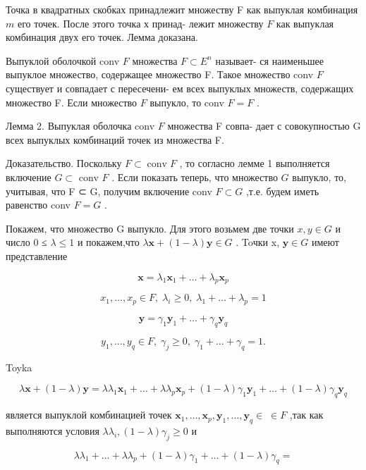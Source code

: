 \documentclass[8pt]{extarticle}
\begin{document}
Точка в квадратных скобках принадлежит множеству F как выпуклая комбинация \(m\) его точек. После этого точка х принад- лежит множеству \(F\) как выпуклая комбинация двух его точек. Лемма доказана.

Выпуклой оболочкой conv \(F\) множества \(F \subset  E^n\) называет- ся наименьшее выпуклое множество, содержащее множество F. Такое множество conv \(F\) существует и совпадает с пересечени- ем всех выпуклых множеств, содержащих множество F. Если множество \(F\) выпукло, то conv \(F = F\) .

Лемма 2. Выпуклая оболочка conv \(F\) множества F совпа- дает с совокупностью G всех выпуклых комбинаций точек из множества F.

Доказательство. Поскольку \(F \subset  \operatorname{conv}F\) , то согласно лемме 1 выполняется включение \(G \subset\) conv \(F\) . Если показать теперь, что множество \(G\) выпукло, то, учитывая, что F ⊂ G, получим включение conv \(F \subset  G\) ,т.е. будем иметь равенство conv \(F = G\) .

Покажем, что множество G выпукло. Для этого возьмем две точки \(x,y \in  G\) и число 0 ≤ \(\lambda  \leq  1\) и покажем,что \(\lambda \mathbf{x} + \left( {1 - \lambda }\right) \mathbf{y} \in  G\) . Toчки x, \(\mathbf{y} \in  G\) имеют представление

\[
\mathbf{x} = {\lambda }_{1}{\mathbf{x}}_{1} + \ldots  + {\lambda }_{p}{\mathbf{x}}_{p}
\]

\[
{x}_{1},\ldots ,{x}_{p} \in  F,\;{\lambda }_{i} \geq  0,\;{\lambda }_{1} + \ldots  + {\lambda }_{p} = 1
\]

\[
\mathbf{y} = {\gamma }_{1}{\mathbf{y}}_{1} + \ldots  + {\gamma }_{q}{\mathbf{y}}_{q}
\]

\[
{y}_{1},\ldots ,{y}_{q} \in  F,\;{\gamma }_{j} \geq  0,\;{\gamma }_{1} + \ldots  + {\gamma }_{q} = 1.
\]

Toyka

\[
\lambda \mathbf{x} + \left( {1 - \lambda }\right) \mathbf{y} = \lambda {\lambda }_{1}{\mathbf{x}}_{1} + \ldots  + \lambda {\lambda }_{p}{\mathbf{x}}_{p} + \left( {1 - \lambda }\right) {\gamma }_{1}{\mathbf{y}}_{1} + \ldots  + \left( {1 - \lambda }\right) {\gamma }_{q}{\mathbf{y}}_{q}
\]

является выпуклой комбинацией точек \({\mathbf{x}}_{1},\ldots ,{\mathbf{x}}_{p},{\mathbf{y}}_{1},\ldots ,{\mathbf{y}}_{q} \in \; \in  F\) ,так как выполняются условия \(\lambda {\lambda }_{i},\left( {1 - \lambda }\right) {\gamma }_{j} \geq  0\) и

\[
\lambda {\lambda }_{1} + \ldots  + \lambda {\lambda }_{p} + \left( {1 - \lambda }\right) {\gamma }_{1} + \ldots  + \left( {1 - \lambda }\right) {\gamma }_{q} =
\]
\end{document}
